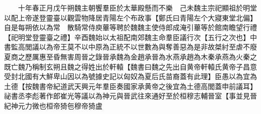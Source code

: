 　　十年春正月戊午朔魏主朝饗羣臣於太華殿懸而不樂　己未魏主宗祀顯祖於明堂以配上帝遂登靈臺以觀雲物降居青陽左个布政事【鄭氏曰青陽左个大寢東堂北偏】自是每朔依以為常　散騎常侍庾蓽等聘於魏魏主使侍郎成淹引蓽等於館南瞻望行禮【祀明堂登靈臺之禮】辛酉魏始以太祖配南郊魏主命羣臣議行次【五行之次也】中書監高閭議以為帝王莫不以中原為正統不以世數為與奪善惡為是非故桀紂至虐不廢夏商之歷厲惠至昏無害周晉之錄晉承魏為金趙承晉為水燕承趙為木秦承燕為火秦之既亡魏乃稱制玄朔且魏之得姓出於軒轅【魏書曰魏之先出自黄帝軒轅氏黄帝子昌意受封北國有大鮮卑山因以為號據史記以匈奴為夏后氏苗裔蓋有此理】臣愚以為宜為土德【按魏書帝紀道武天興元年羣臣奏國家承黄帝之後宜為土德高閭蓋申前議耳】祕書丞李彪著作郎崔光等議以為神元與晉武往來通好至於桓穆志輔晉室【事並見晉紀神元力微也桓帝猗㐌穆帝猗盧